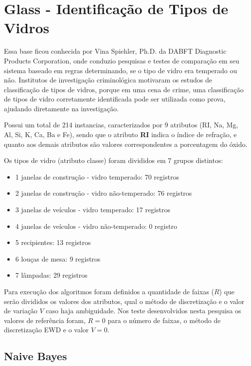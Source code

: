 \section{Glass - Identificação de Tipos de Vidros}\label{cap:resultados:ssec:iris}

Essa base ficou conhecida por Vina Spiehler, Ph.D. da DABFT Diagnostic Products Corporation, onde conduzio pesquisas e testes de comparação em seu sistema baseado em regras determinando, se o tipo de vidro era temperado ou não. Institutos de investigação criminológica motivaram os estudos de classificação de tipos de vidros, porque em uma cena de crime, uma classificação de tipos de vidro corretamente identificada pode ser utilizada como prova, ajudando diretamente na investigação.

Possui um total de 214 instancias, caracterizados por 9 atributos (RI, Na, Mg, Al, Si, K, Ca, Ba e Fe), sendo que o atributo \textbf{RI} indica o índice de refração, e quanto aos demais atributos são valores correspondentes a porcentagem do óxido.

Os tipos de vidro (atributo classe) foram divididos em 7 grupos distintos:
\begin{itemize}
 \item 1 janelas de construção - vidro temperado: 70 registros
 \item 2 janelas de construção - vidro não-temperado: 76 registros
 \item 3 janelas de veículos - vidro temperado: 17 registros
 \item 4 janelas de veículos - vidro não-temperado: 0 registro
 \item 5 recipientes: 13 registros
 \item 6 louças de mesa: 9 registros
 \item 7 lâmpadas: 29 registros 
\end{itemize}

Para execução dos algoritmos foram definidos a quantidade de faixas (${R}$) que serão divididos os valores dos atributos, qual o método de discretização e o valor de variação ${V}$ caso haja ambiguidade. Nos teste desenvolvidos nesta pesquisa os valores de referência foram, ${R=0}$ para o número de faixas, o método de discretização EWD e o valor  ${V=0}$.


\subsection{Naive Bayes} \label{cap:resultados:ssec:glass:nb}

